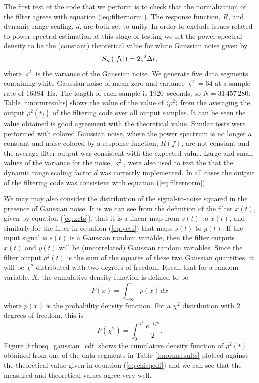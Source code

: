The first test of the code that we perform is to check that the normalization
of the filter agrees with equation (\ref{eq:filternorm}). The response
function, $R$, and dynamic range scaling, $d$, are both set to unity. In order
to exclude issues related to power spectral estimation at this stage of
testing  we set the power spectral density to be the (constant) theoretical
value for white Gaussian noise given by
\begin{equation}
S_n\left(\left|f_{k}\right|\right) = 2 \varsigma^2 \Delta t,
\label{eq:gaussianpsd}
\end{equation}
where $\varsigma^2$ is the variance of the Gaussian noise.  We generate five
data segments containing white Gaussian noise of mean zero and variance
$\varsigma^2 = 64$ at a sample rate of $16384$~Hz. The length of each sample is
$1920$~seconds, so $N = 31\,457\,280$. Table \ref{t:normresults} shows the value
of the value of $\langle \rho^2 \rangle$ from the averaging the output
$\rho^2(t_j)$ of the filtering code over all output samples. It can be seen
the value obtained is good agreement with the theoretical value.  Similar
tests were performed with colored Gaussian noise, where the power spectrum is
no longer a constant and noise colored by a response function, $R(f)$, are not
constant and the average filter output was consistent with the expected value.
Large and small values of the variance for the noise, $\varsigma^2$, were also
used to test the that the dynamic range scaling factor $d$ was correctly
implemented. In all cases the output of the filtering code was consistent with
equation (\ref{eq:filternorm}).

We may may also consider the distribution of the signal-to-noise squared in
the presence of Gaussian noise. It is we can see from the definition of the
filter $x(t)$, given by equation (\ref{eq:xcts}), that it is a linear map from
$s(t)$ to $x(t)$, and similarly for the filter in equation (\ref{eq:ycts}) that
maps $s(t)$ to $y(t)$. If the input signal is $s(t)$ is a Gaussian random
variable, then the filter outputs $x(t)$ and $y(t)$ will be (uncorrelated)
Gaussian random variables. Since the filter output $\rho^2(t)$ is the sum of
the squares of these two Gaussian quantities, it will be $\chi^2$ distributed
with two degrees of freedom. Recall that for a random variable, $X$, the
cumulative density function is defined to be
\begin{equation}
P(x) = \int_{-\infty}^x p(x)\, dx
\end{equation}
where $p(x)$ is the probability density function. For a $\chi^2$ distribution
with $2$ degrees of freedom, this is
\begin{equation}
P(\chi^2) = \int_0^{\chi^2} \frac{e^{-t/2}}{2}.
\label{eq:chisqcdf}
\end{equation}
Figure \ref{f:rhosq_gaussian_cdf} shows the cumulative density function of
$\rho^2(t)$ obtained from one of the data segments in Table
\ref{t:normresults} plotted against the theoretical value given in equation
(\ref{eq:chisqcdf}) and we can see that the measured and theoretical values
agree very well.

